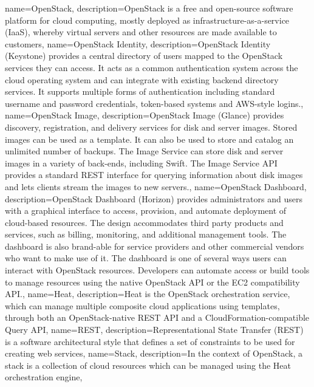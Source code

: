 {
  name={OpenStack},
  description={OpenStack is a free and open-source software platform for
  cloud computing, mostly deployed as infrastructure-as-a-service
  (IaaS), whereby virtual servers and other resources are made available
  to customers},
}
{
  name={OpenStack Identity},
  description={OpenStack Identity (Keystone) provides a central
  directory of users mapped to the OpenStack services they can
  access. It acts as a common authentication system across the cloud
  operating system and can integrate with existing backend directory
  services. It supports multiple forms of authentication including
  standard username and password credentials, token-based systems and
  AWS-style logins.},
}
{
  name={OpenStack Image},
  description={OpenStack Image (Glance) provides discovery,
  registration, and delivery services for disk and server images. Stored
  images can be used as a template. It can also be used to store and
  catalog an unlimited number of backups. The Image Service can store
  disk and server images in a variety of back-ends, including Swift. The
  Image Service API provides a standard \gls{REST} interface for
  querying information about disk images and lets clients stream the
  images to new servers.},
}
{
  name={OpenStack Dashboard},
  description={OpenStack Dashboard (Horizon) provides administrators and
  users with a graphical interface to access, provision, and automate
  deployment of cloud-based resources. The design accommodates third
  party products and services, such as billing, monitoring, and
  additional management tools. The dashboard is also brand-able for
  service providers and other commercial vendors who want to make use of
  it. The dashboard is one of several ways users can interact with
  OpenStack resources. Developers can automate access or build tools to
  manage resources using the native OpenStack API or the EC2
  compatibility API.},
}
{
  name={Heat},
  description={Heat is the OpenStack orchestration service, which can
  manage multiple composite cloud applications using templates,
  through both an OpenStack-native \gls{REST} API and a
  CloudFormation-compatible Query API},
}
{
  name={REST},
  description={Representational State Transfer (REST) is a software
  architectural style that defines a set of constraints to be used for
  creating web services},
}
{
  name={Stack},
  description={In the context of \gls{OpenStack}, a stack is a
  collection of cloud resources which can be managed using the
  \gls{Heat} orchestration engine},
}
